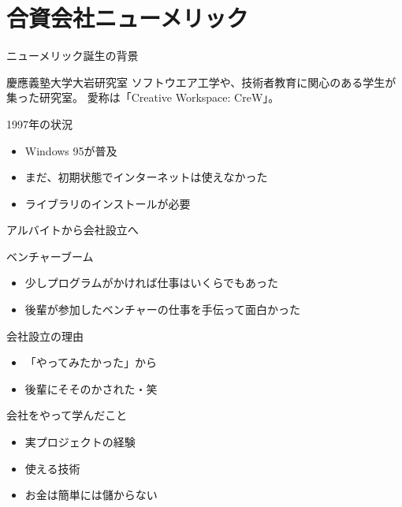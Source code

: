 \documentclass{beamer}
\begin{document}
\section{合資会社ニューメリック}
\label{sec-2}
\begin{frame}[label=sec-2-1]{ニューメリック誕生の背景}
\begin{block}{慶應義塾大学大岩研究室}
ソフトウエア工学や、技術者教育に関心のある学生が集った研究室。
愛称は「Creative Workspace: CreW」。
\end{block}
\begin{block}{1997年の状況}
\begin{itemize}
\item Windows 95が普及
\item まだ、初期状態でインターネットは使えなかった
\item ライブラリのインストールが必要
\end{itemize}
\end{block}
\end{frame}
\begin{frame}[label=sec-2-2]{アルバイトから会社設立へ}
\begin{block}{ベンチャーブーム}
\begin{itemize}
\item 少しプログラムがかければ仕事はいくらでもあった
\item 後輩が参加したベンチャーの仕事を手伝って面白かった
\end{itemize}
\end{block}
\begin{block}{会社設立の理由}
\begin{itemize}
\item 「やってみたかった」から
\item 後輩にそそのかされた・笑
\end{itemize}
\end{block}
\begin{block}{会社をやって学んだこと}
\begin{itemize}
\item 実プロジェクトの経験
\item 使える技術
\item お金は簡単には儲からない
\end{itemize}
\end{block}
\end{frame}
\end{document}

